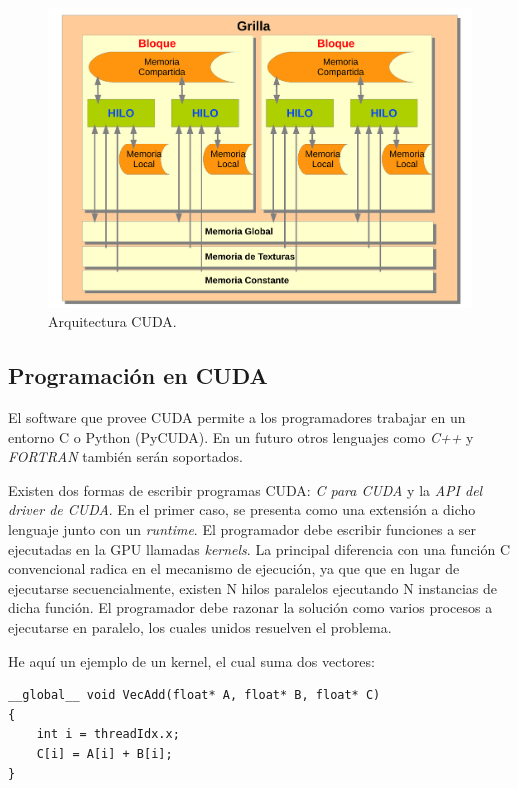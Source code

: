 \begin{figure}[h]
\begin{center}
\includegraphics[width=13cm]{figures/cuda}
\end{center}
\caption{Arquitectura CUDA.}
\label{fg:cuda}
\end{figure}


\subsection{Programación en CUDA}
El software que provee CUDA permite a los programadores trabajar en un entorno C o Python (PyCUDA).
En un futuro otros lenguajes como {\em C++} y {\em FORTRAN} tambi\'en ser\'an soportados. 

Existen dos formas de escribir programas CUDA: {\em C para CUDA} y la {\em API del driver de CUDA}.
En el primer caso, se presenta como una extensi\'on a dicho lenguaje junto con un {\em runtime}.
El programador debe escribir funciones a ser ejecutadas en la GPU llamadas {\em kernels}. 
La principal diferencia con una funci\'on C convencional radica en el mecanismo de ejecución, ya que que en lugar de ejecutarse secuencialmente, existen N hilos paralelos ejecutando N instancias de dicha funci\'on. 
El programador debe razonar la solución como varios procesos a ejecutarse en paralelo, los cuales unidos resuelven el problema.

He aqu\'i un ejemplo de un kernel, el cual suma dos vectores:

\begin{verbatim}
__global__ void VecAdd(float* A, float* B, float* C)
{
    int i = threadIdx.x;
    C[i] = A[i] + B[i];
}
\end{verbatim}

